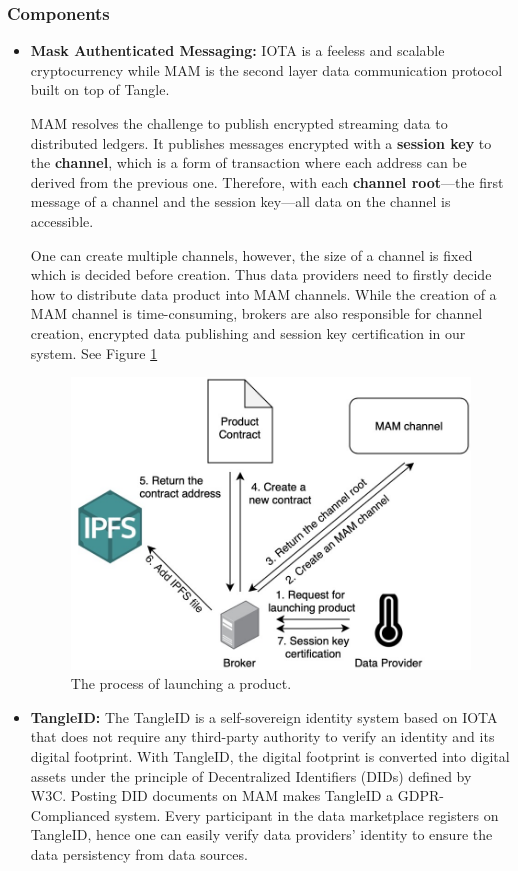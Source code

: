 \documentclass[journal,article,submit,moreauthors,pdftex]{Definitions/mdpi}
\begin{document}
\subsubsection{Components}
\begin{itemize}[leftmargin=*,labelsep=5.8mm]
\item \textbf{Mask Authenticated Messaging: }
IOTA\cite{IOTAwhitepaper} is a feeless and scalable cryptocurrency while MAM is the second layer data communication protocol built on top of Tangle.

MAM resolves the challenge to publish encrypted streaming data to distributed ledgers. It publishes messages encrypted with a \textbf{session key} to the \textbf{channel}, which is a form of transaction where each address can be derived from the previous one. Therefore, with each \textbf{channel root}—the first message of a channel and the session key—all data on the channel is accessible.

One can create multiple channels, however, the size of a channel is fixed which is decided before creation. Thus data providers need to firstly decide how to distribute data product into MAM channels. While the creation of a MAM channel is time-consuming, brokers are also responsible for channel creation, encrypted data publishing and session key certification in our system. See Figure \ref{fig:launching_product}


\begin{figure}[H]
    \centering
    \includegraphics[width=3.3 in]{launching_product}
    \caption{The process of launching a product.}
    \label{fig:launching_product}
\end{figure}

\item \textbf{TangleID: }
The TangleID\cite{TangleID} is a self-sovereign identity system based on IOTA that does not require any third-party authority to verify an identity and its digital footprint. With TangleID, the digital footprint is converted into digital assets under the principle of Decentralized Identifiers (DIDs)\cite{DID} defined by W3C. Posting DID documents on MAM makes TangleID a GDPR-Complianced system\cite{GDPR}. Every participant in the data marketplace registers on TangleID, hence one can easily verify data providers' identity to ensure the data persistency from data sources.



\end{itemize}
\end{document}
